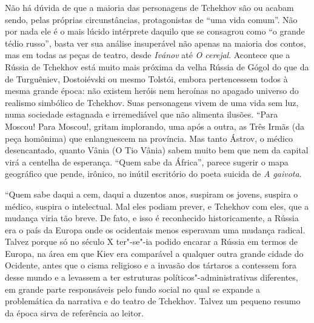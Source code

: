 Não há dúvida de que a maioria das personagens de Tchekhov são ou acabam
sendo, pelas próprias circunstâncias, protagonistas de ``uma vida
comum''. Não por nada ele é o mais lúcido intérprete daquilo que se
consagrou como ``o grande tédio russo'', basta ver sua análise
insuperável não apenas na maioria dos contos, mas em todas as peças de
teatro, desde \emph{Ivánov} até \emph{O cerejal}. Acontece que a Rússia
de Tchekhov está muito mais próxima da velha Rússia de Gógol do que da
de Turguêniev, Dostoiévski ou mesmo Tolstói, embora pertencessem todos à
mesma grande época: não existem heróis nem heroínas no apagado universo
do realismo simbólico de Tchekhov. Suas personagens vivem de uma vida
sem luz, numa sociedade estagnada e irremediável que não alimenta
ilusões. ``Para Moscou! Para Moscou!, gritam implorando, uma após a
outra, as Três Irmãs (da peça homônima) que enlanguescem na província.
Mas tanto Ástrov, o médico desencantado, quanto Vânia (O Tio Vânia)
sabem muito bem que nem da capital virá a centelha de esperança. ``Quem
sabe da África'', parece sugerir o mapa geográfico que pende, irônico,
no inútil escritório do poeta suicida de \emph{A gaivota}.

``Quem sabe daqui a cem, daqui a duzentos anos, suspiram os jovens,
suspira o médico, suspira o intelectual. Mal eles podiam prever, e
Tchekhov com eles, que a mudança viria tão breve. De fato, e isso é
reconhecido historicamente, a Rússia era o país da Europa onde os
ocidentais menos esperavam uma mudança radical. Talvez porque só no
século X ter"-se"-ia podido encarar a Rússia em termos de Europa, na área
em que Kiev era comparável a qualquer outra grande cidade do Ocidente,
antes que o cisma religioso e a invasão dos tártaros a contessem fora
desse mundo e a levassem a ter estruturas políticos"-administrativas
diferentes, em grande parte responsáveis pelo fundo social no qual se
expande a problemática da narrativa e do teatro de Tchekhov. Talvez um
pequeno resumo da época sirva de referência ao leitor.


